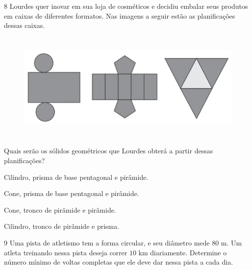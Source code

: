 \num{8}  Lourdes quer inovar em sua loja de cosméticos e decidiu embalar seus
produtos em caixas de diferentes formatos. Nas imagens a seguir estão as
planificações dessas caixas.

\begin{figure}[H]
\includegraphics[width=5.90625in,height=2.125in]{./imgSAEB_6_MAT/media/image51.png}
\end{figure}

Quais serão os sólidos geométricos que Lourdes obterá a partir dessas
planificações?

\begin{escolha}
\item Cilindro, prisma de base pentagonal e pirâmide. 
\item Cone, prisma de base pentagonal e pirâmide.
\item Cone, tronco de pirâmide e pirâmide.
\item Cilindro, tronco de pirâmide e prisma.
\end{escolha}

\num{9}  Uma pista de atletismo tem a forma circular, e seu diâmetro mede $80$ m.
Um atleta treinando nessa pista deseja correr $10$ km diariamente.
Determine o número mínimo de voltas completas que ele deve dar nessa
pista a cada dia.\enlargethispage{2\baselineskip}

